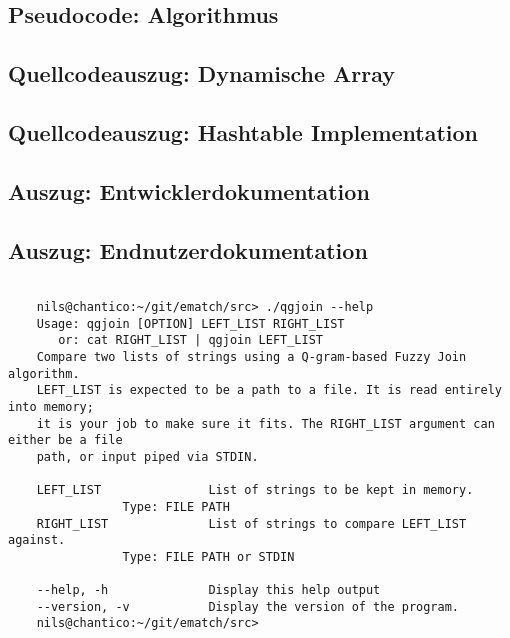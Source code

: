 \subsection{Pseudocode: Algorithmus}
\begin{figure}[!htp]
	
	\centering
\end{figure}

\subsection{Quellcodeauszug: Dynamische Array}


\subsection{Quellcodeauszug: Hashtable Implementation}


\subsection{Auszug: Entwicklerdokumentation}


\subsection{Auszug: Endnutzerdokumentation}
\begin{lstlisting}[style=xterm, caption=Ausgabe der Endnutzerdokumentation über den --help parameter, label=fig:cliHelp,]

	nils@chantico:~/git/ematch/src> ./qgjoin --help
	Usage: qgjoin [OPTION] LEFT_LIST RIGHT_LIST
	   or: cat RIGHT_LIST | qgjoin LEFT_LIST
	Compare two lists of strings using a Q-gram-based Fuzzy Join algorithm.
	LEFT_LIST is expected to be a path to a file. It is read entirely into memory;
	it is your job to make sure it fits. The RIGHT_LIST argument can either be a file
	path, or input piped via STDIN.
	
	LEFT_LIST               List of strings to be kept in memory.
				Type: FILE PATH
	RIGHT_LIST              List of strings to compare LEFT_LIST against.
				Type: FILE PATH or STDIN
	
	--help, -h              Display this help output
	--version, -v           Display the version of the program.
	nils@chantico:~/git/ematch/src>

\end{lstlisting}


